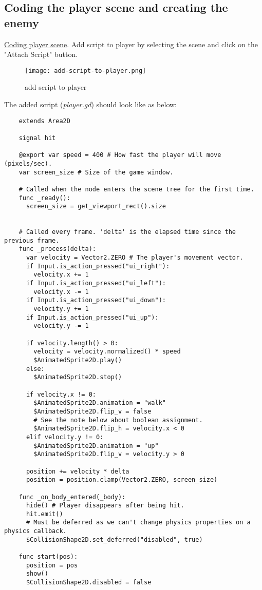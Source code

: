 \subsection{Coding the player scene and creating the enemy}
  \href{https://docs.godotengine.org/en/stable/getting_started/first_2d_game/03.coding_the_player.html}{\color{blue}Coding player scene}. 
  Add script to player by selecting the scene and click on the "Attach Script" button.
  \begin{figure}[H]
    \centering
    \texttt{[image: add-script-to-player.png]}
    \caption{add script to player}
    \label{fig:add-script-to-player}
  \end{figure}
  The added script (\textit{player.gd}) should look like as below:
  \begin{verbatim}
    extends Area2D

    signal hit

    @export var speed = 400 # How fast the player will move (pixels/sec).
    var screen_size # Size of the game window.
    
    # Called when the node enters the scene tree for the first time.
    func _ready():
      screen_size = get_viewport_rect().size
    
    
    # Called every frame. 'delta' is the elapsed time since the previous frame.
    func _process(delta):
      var velocity = Vector2.ZERO # The player's movement vector.
      if Input.is_action_pressed("ui_right"):
        velocity.x += 1
      if Input.is_action_pressed("ui_left"):
        velocity.x -= 1
      if Input.is_action_pressed("ui_down"):
        velocity.y += 1
      if Input.is_action_pressed("ui_up"):
        velocity.y -= 1
    
      if velocity.length() > 0:
        velocity = velocity.normalized() * speed
        $AnimatedSprite2D.play()
      else:
        $AnimatedSprite2D.stop()
      
      if velocity.x != 0:
        $AnimatedSprite2D.animation = "walk"
        $AnimatedSprite2D.flip_v = false
        # See the note below about boolean assignment.
        $AnimatedSprite2D.flip_h = velocity.x < 0
      elif velocity.y != 0:
        $AnimatedSprite2D.animation = "up"
        $AnimatedSprite2D.flip_v = velocity.y > 0
      
      position += velocity * delta
      position = position.clamp(Vector2.ZERO, screen_size)  
      
    func _on_body_entered(_body):
      hide() # Player disappears after being hit.
      hit.emit()
      # Must be deferred as we can't change physics properties on a physics callback.
      $CollisionShape2D.set_deferred("disabled", true)
      
    func start(pos):
      position = pos
      show()
      $CollisionShape2D.disabled = false
  \end{verbatim} 
